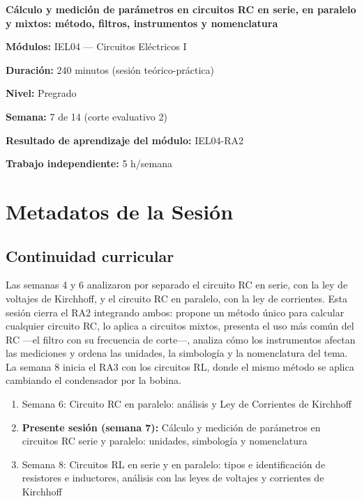 \documentclass[11pt,letterpaper]{article}
\begin{document}
\begin{cabecera}
{\color{iubyellow}\Large\bfseries Cálculo y medición de parámetros en circuitos RC en serie, en paralelo y mixtos: método, filtros, instrumentos y nomenclatura\par}
\vspace{0.6em}
\small
\textbf{\color{iubyellow}Módulos:} IEL04 --- Circuitos Eléctricos I\par
\textbf{\color{iubyellow}Duración:} 240 minutos (sesión teórico-práctica)\par
\textbf{\color{iubyellow}Nivel:} Pregrado\par
\textbf{\color{iubyellow}Semana:} 7 de 14 (corte evaluativo 2)\par
\textbf{\color{iubyellow}Resultado de aprendizaje del módulo:} IEL04-RA2\par
\textbf{\color{iubyellow}Trabajo independiente:} 5 h/semana\par
\end{cabecera}

\section{Metadatos de la Sesión}

\subsection{Continuidad curricular}

Las semanas 4 y 6 analizaron por separado el circuito RC en serie, con la ley de voltajes de Kirchhoff, y el circuito RC en paralelo, con la ley de corrientes. Esta sesión cierra el RA2 integrando ambos: propone un método único para calcular cualquier circuito RC, lo aplica a circuitos mixtos, presenta el uso más común del RC ---el filtro con su frecuencia de corte---, analiza cómo los instrumentos afectan las mediciones y ordena las unidades, la simbología y la nomenclatura del tema. La semana 8 inicia el RA3 con los circuitos RL, donde el mismo método se aplica cambiando el condensador por la bobina.

\begin{enumerate}
  \item Semana 6: Circuito RC en paralelo: análisis y Ley de Corrientes de Kirchhoff
  \item \textbf{Presente sesión (semana 7):} Cálculo y medición de parámetros en circuitos RC serie y paralelo: unidades, simbología y nomenclatura
  \item Semana 8: Circuitos RL en serie y en paralelo: tipos e identificación de resistores e inductores, análisis con las leyes de voltajes y corrientes de Kirchhoff
\end{enumerate}
\end{document}
